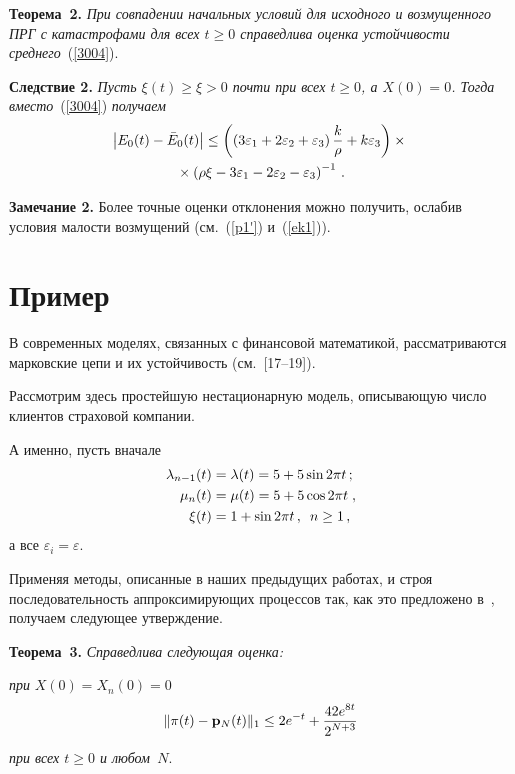 \begin{multicols}{2}
\medskip

\noindent
\textbf{Теорема~2.} 
\textit{При совпадении начальных условий для исходного и возмущенного ПРГ с катастрофами для всех $t \ge 0$ 
справедлива оценка устойчивости среднего}~(\ref{3004}).

\medskip

\noindent
\textbf{Следствие 2.}
\textit{Пусть $\xi(t) \ge \xi >0$ почти при всех $t \ge 0$, а $X(0)=0$. Тогда вместо}~(\ref{3004}) \textit{получаем}
\begin{multline*}
\left|E_{0}(t)- \bar{E}_{0}(t)\right| \le
\left(\left(3\varepsilon_1 +2\varepsilon_2 +  \varepsilon_3\right) 
\displaystyle\frac{\displaystyle k\mathstrut}{\displaystyle \rho\mathstrut} + k\varepsilon_3\right)\times{}\\
{}\times \left( \rho \xi -
3\varepsilon_1 -2\varepsilon_2 -  \varepsilon_3 \right)^{-1}\,.
\end{multline*}

\medskip

\noindent
\textbf{Замечание 2.} Более точные оценки отклонения можно получить, ослабив условия малости возмущений 
(см.~(\ref{p1'}) и~(\ref{ek1})).

\section{Пример}

В современных моделях, связанных с финансовой математикой, рассматриваются марковские цепи и их устойчивость 
(см.~[17--19]).

Рассмотрим здесь простейшую нестационарную модель, описывающую число клиентов страховой компании.

А именно, пусть  вначале 
\begin{align*}
\lambda_{n-1}(t) &= \lambda(t) = 5+5\sin 2\pi t \,; \\
\mu_n(t) &= \mu(t) =5 + 5\cos 2\pi t \;,\\
\xi(t)&=1 + \sin 2 \pi t\,,\enskip n \ge 1\,,
\end{align*} 
а все $\varepsilon_i = \varepsilon$.

Применяя методы, описанные в наших предыду\-щих работах, и строя последовательность 
аппроксимирующих процессов так, как это предложено в~\cite{zAT}, получаем следующее утверждение.

\medskip

\noindent
\textbf{Теорема~3.} \textit{Справедлива следующая оценка:}

\textit{при} $X(0) = X_n (0) = 0$
\begin{equation*}
\|{\bf \pi}(t) - {\bf p}_N (t)\|_{1} \le 2 e^{-t}+ \displaystyle\frac{\displaystyle 42 e^{8 t}\mathstrut}{\displaystyle 2^{N+3}\mathstrut}
\end{equation*}
\textit{при всех $t \ge 0$ и любом~$N$}.


\end{multicols}
